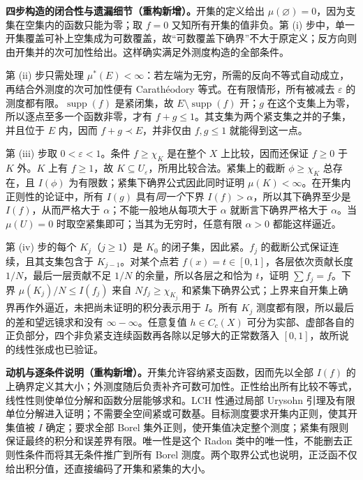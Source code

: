\documentclass[../../main.tex]{subfiles}
\begin{document}
\begin{remark}
\textbf{四步构造的闭合性与遗漏细节（重构新增）。}开集的定义给出 $\mu(\varnothing)=0$，因为支集在空集内的函数只能为零；取 $f=0$ 又知所有开集的值非负。第 (i) 步中，单一开集覆盖可补上空集成为可数覆盖，故“可数覆盖下确界”不大于原定义；反方向则由开集并的次可加性给出。这样确实满足外测度构造的全部条件。

第 (ii) 步只需处理 $\mu^*(E)<\infty$：若左端为无穷，所需的反向不等式自动成立，再结合外测度的次可加性便有 Carathéodory 等式。在有限情形，所有被减去 $\varepsilon$ 的测度都有限。$\operatorname{supp}(f)$ 是紧闭集，故 $E\setminus\operatorname{supp}(f)$ 开；$g$ 在这个支集上为零，所以逐点至多一个函数非零，才有 $f+g\leqslant1$。其支集为两个紧支集之并的子集，并且位于 $E$ 内，因而 $f+g\prec E$，并非仅由 $f,g\leqslant1$ 就能得到这一点。

第 (iii) 步取 $0<\varepsilon<1$。条件 $f\geqslant\chi_K$ 是在整个 $X$ 上比较，因而还保证 $f\geqslant0$ 于 $K$ 外。$K$ 上有 $f\geqslant1$，故 $K\subseteq U_\varepsilon$，所用比较合法。紧集上的截断 $\phi\geqslant\chi_K$ 总存在，且 $I(\phi)$ 为有限数；紧集下确界公式因此同时证明 $\mu(K)<\infty$。在开集内正则性的论证中，所有 $I(g)$ 具有\emph{同一个}下界 $I(f)>\alpha$，所以其下确界至少是 $I(f)$，从而严格大于 $\alpha$；不能一般地从每项大于 $\alpha$ 就断言下确界严格大于 $\alpha$。当 $\mu(U)=0$ 时取空紧集即可；当其为无穷时，任意有限 $\alpha>0$ 都能这样逼近。

第 (iv) 步的每个 $K_j$（$j\geqslant1$）是 $K_0$ 的闭子集，因此紧。$f_j$ 的截断公式保证连续，且其支集包含于 $K_{j-1}$。对某个点若 $f(x)=t\in[0,1]$，各层依次贡献长度 $1/N$，最后一层贡献不足 $1/N$ 的余量，所以各层之和恰为 $t$，证明 $\sum f_j=f$。下界 $\mu(K_j)/N\leqslant I(f_j)$ 来自 $Nf_j\geqslant\chi_{K_j}$ 和紧集下确界公式；上界来自开集上确界再作外逼近，未把尚未证明的积分表示用于 $I$。所有 $K_j$ 测度都有限，所以最后的差和望远镜求和没有 $\infty-\infty$。任意复值 $h\in C_c(X)$ 可分为实部、虚部各自的正负部分，四个非负紧支连续函数再各除以足够大的正常数落入 $[0,1]$，故所说的线性张成也已验证。
\end{remark}
\begin{remark}
\textbf{动机与逐条件说明（重构新增）。}开集允许容纳紧支函数，因而先以全部 $I(f)$ 的上确界定义其大小；外测度随后负责补齐可数可加性。正性给出所有比较不等式，线性性则使单位分解和函数分层能够求和。LCH 性通过局部 Urysohn 引理及有限单位分解进入证明；不需要全空间紧或可数基。目标测度要求开集内正则，使其开集值被 $I$ 确定；要求全部 Borel 集外正则，使开集值决定整个测度；紧集有限则保证最终的积分和误差界有限。唯一性是这个 Radon 类中的唯一性，不能删去正则性条件而将其无条件推广到所有 Borel 测度。两个取界公式也说明，正泛函不仅给出积分值，还直接编码了开集和紧集的大小。
\end{remark}
\end{document}
